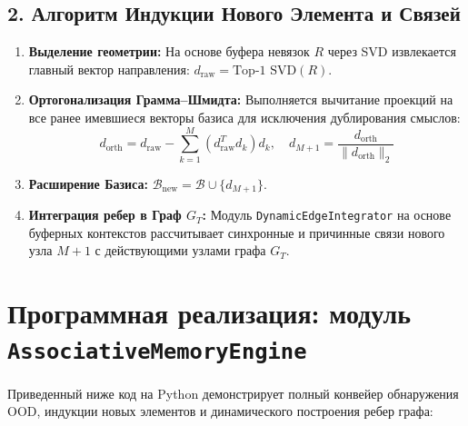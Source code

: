 \documentclass[11pt,a4paper]{article}
\begin{document}
\subsection*{2. Алгоритм Индукции Нового Элемента и Связей}
\begin{enumerate}
    \item \textbf{Выделение геометрии:} На основе буфера невязок $R$ через SVD извлекается главный вектор направления: $d_{\text{raw}} = \text{Top-1 SVD}(R)$.
    \item \textbf{Ортогонализация Грамма--Шмидта:} Выполняется вычитание проекций на все ранее имевшиеся векторы базиса для исключения дублирования смыслов:
    \begin{equation}
    d_{\text{orth}} = d_{\text{raw}} - \sum_{k=1}^M (d_{\text{raw}}^T d_k) d_k, \quad d_{M+1} = \frac{d_{\text{orth}}}{\|d_{\text{orth}}\|_2}
    \end{equation}
    \item \textbf{Расширение Базиса:} $\mathcal{B}_{\text{new}} = \mathcal{B} \cup \{d_{M+1}\}$.
    \item \textbf{Интеграция ребер в Граф $G_T$:} Модуль \texttt{DynamicEdgeIntegrator} на основе буферных контекстов рассчитывает синхронные и причинные связи нового узла $M+1$ с действующими узлами графа $G_T$.
\end{enumerate}

\section{Программная реализация: модуль \texttt{AssociativeMemoryEngine}}

Приведенный ниже код на Python демонстрирует полный конвейер обнаружения OOD, индукции новых элементов и динамического построения ребер графа:
\end{document}
